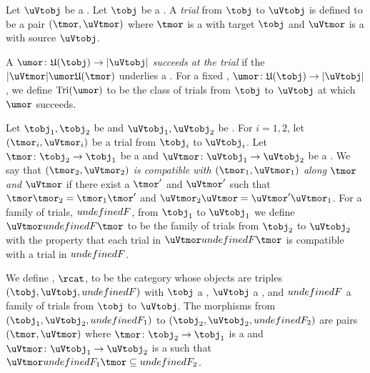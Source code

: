 \documentclass[%
a4paper,%
arxiv,%
defaults
]{myclass}
\begin{document}
\begin{defn}
Let \(\uVtobj\) be a \uVtobj.
Let \(\tobj\) be a \tobj.
A \emph{trial} from \(\tobj\) to \(\uVtobj\) is defined to be a pair \(\trial{}\) where \(\tmor\) is a \tmor with target \(\tobj\) and \(\uVtmor\) is a \uVtmor with source \(\uVtobj\).

A \umor \(\umor \colon \ufunc(\tobj) \to \abs{\uVtobj}\) \emph{succeeds at the trial} if the \umor \(\trial{\umor}\) underlies a \uVtmor.
For a fixed \umor, \(\umor \colon \ufunc(\tobj) \to \abs{\uVtobj}\), we define \(\trials{\umor}\) to be the class of trials from \(\tobj\) to \(\uVtobj\) at which \(\umor\) succeeds.

Let \(\tobj_1, \tobj_2\) be \tobjs and \(\uVtobj_1, \uVtobj_2\) be \uVtobjs.
For \(i = 1,2\), let \(\trial[_i]{}\) be a trial from \(\tobj_i\) to \(\uVtobj_i\).
Let \(\tmor \colon \tobj_2 \to \tobj_1\) be a \tmor and \(\uVtmor \colon \uVtobj_1 \to \uVtobj_2\) be a \uVtmor.
We say that \emph{\(\trial[_2]{}\) is compatible with \(\trial[_1]{}\) along \(\tmor\) and \(\uVtmor\)} if there exist a \tmor \(\tmor'\) and \uVtmor \(\uVtmor'\) such that \(\tmor \tmor_2 = \tmor_1 \tmor'\) and \(\uVtmor_2 \uVtmor = \uVtmor' \uVtmor_1\).
For a family of trials, \(\m{F}\), from \(\tobj_1\) to \(\uVtobj_1\) we define \(\uVtmor \m{F} \tmor\) to be the family of trials from \(\tobj_2\) to \(\uVtobj_2\) with the property that each trial in \(\uVtmor \m{F} \tmor\) is compatible with a trial in \(\m{F}\).

We define \rcat, \(\rcat\), to be the category whose objects are triples \((\tobj, \uVtobj, \m{F})\) with \(\tobj\) a \tobj, \(\uVtobj\) a \uVtobj, and \(\m{F}\) a family of trials from \(\tobj\) to \(\uVtobj\).
The morphisms from \((\tobj_1, \uVtobj_2, \m{F}_1)\) to \((\tobj_2, \uVtobj_2, \m{F}_2)\) are pairs \((\tmor, \uVtmor)\) where \(\tmor \colon \tobj_2 \to \tobj_1\) is a \tmor and \(\uVtmor \colon \uVtobj_1 \to \uVtobj_2\) is a \uVtmor such that \(\uVtmor \m{F}_1 \tmor \subseteq \m{F}_2\).
\end{defn}
\end{document}
